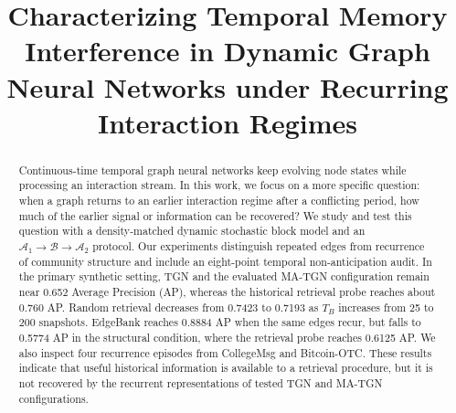 \documentclass[conference]{IEEEtran}
\begin{document}
\title{Characterizing Temporal Memory Interference in Dynamic Graph Neural Networks under Recurring Interaction Regimes}

\author{
\and
{}
}

\maketitle

\begin{abstract}
Continuous-time temporal graph neural networks keep evolving node states while processing an interaction stream. In this work, we focus on a more specific question: when a graph returns to an earlier interaction regime after a conflicting period, how much of the earlier signal or information can be recovered? We study and test this question with a density-matched dynamic stochastic block model and an $\mathcal{A}_1 \to \mathcal{B} \to \mathcal{A}_2$ protocol. Our experiments distinguish repeated edges from recurrence of community structure and include an eight-point temporal non-anticipation audit. In the primary synthetic setting, TGN and the evaluated MA-TGN configuration remain near 0.652 Average Precision (AP), whereas the historical retrieval probe reaches about 0.760 AP. Random retrieval decreases from 0.7423 to 0.7193 as $T_B$ increases from 25 to 200 snapshots. EdgeBank reaches 0.8884 AP when the same edges recur, but falls to 0.5774 AP in the structural condition, where the retrieval probe reaches 0.6125 AP. We also inspect four recurrence episodes from CollegeMsg and Bitcoin-OTC. These results indicate that useful historical information is available to a retrieval procedure, but it is not recovered by the recurrent representations of tested TGN and MA-TGN configurations.
\end{abstract}
\end{document}
